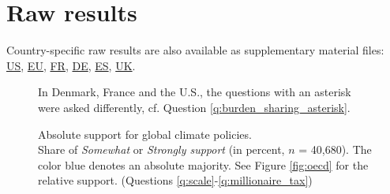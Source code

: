 \clearpage
\section{Raw results%
}\label{app:raw_results}

Country-specific raw results are also available as supplementary material files:  \href{https://github.com/bixiou/global_tax_attitudes/raw/main/paper/app_desc_stats_US.pdf}{US}, \href{https://github.com/bixiou/global_tax_attitudes/raw/main/paper/app_desc_stats_EU.pdf}{EU}, \href{https://github.com/bixiou/global_tax_attitudes/raw/main/paper/app_desc_stats_FR.pdf}{FR}, \href{https://github.com/bixiou/global_tax_attitudes/raw/main/paper/app_desc_stats_DE.pdf}{DE}, \href{https://github.com/bixiou/global_tax_attitudes/raw/main/paper/app_desc_stats_ES.pdf}{ES}, \href{https://github.com/bixiou/global_tax_attitudes/raw/main/paper/app_desc_stats_UK.pdf}{UK}.

\begin{figure}[h!]
    \caption[Absolute support for global climate policies]{Absolute support for global climate policies. \\ Share of \textit{Somewhat} or \textit{Strongly support} (in percent, $n$ = 40,680). The color blue denotes an absolute majority. See Figure \ref{fig:oecd} for the relative support. (Questions \ref{q:scale}-\ref{q:millionaire_tax})} 
    \label{fig:oecd_absolute}
    {\footnotesize *In Denmark, France and the U.S., the questions with an asterisk were asked differently, cf. Question \ref{q:burden_sharing_asterisk}. } 
\end{figure}

